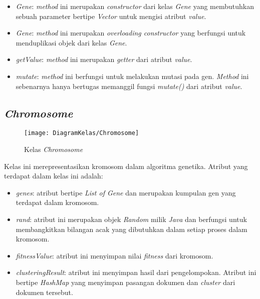 \begin{itemize}
	\item \textit{Gene}: \textit{method} ini merupakan \textit{constructor} dari kelas \textit{Gene} yang membutuhkan sebuah parameter bertipe \textit{Vector} untuk mengisi atribut \textit{value}.
	\item \textit{Gene}: \textit{method} ini merupakan \textit{overloading constructor} yang berfungsi untuk menduplikasi objek dari kelas \textit{Gene}.
	\item \textit{getValue}: \textit{method} ini merupakan \textit{getter} dari atribut \textit{value}.
	\item \textit{mutate}: \textit{method} ini berfungsi untuk melakukan mutasi pada gen. \textit{Method} ini sebenarnya hanya bertugas memanggil fungsi \textit{mutate()} dari atribut \textit{value}.
\end{itemize}

\subsection{\textit{Chromosome}}

\begin{figure}[H]
	\begin{center}
		\texttt{[image: DiagramKelas/Chromosome]}
		\caption{Kelas \textit{Chromosome}}
		\label{fig:kelasChromosome}
	\end{center}
\end{figure}

Kelas ini merepresentasikan kromosom dalam algoritma genetika. Atribut yang terdapat dalam kelas ini adalah:

\begin{itemize}
	\item \textit{genes}: atribut bertipe \textit{List of Gene} dan merupakan kumpulan gen yang terdapat dalam kromosom.
	\item \textit{rand}: atribut ini merupakan objek \textit{Random} milik \textit{Java} dan berfungsi untuk membangkitkan bilangan acak yang dibutuhkan dalam setiap proses dalam kromosom.
	\item \textit{fitnessValue}: atribut ini menyimpan nilai \textit{fitness} dari kromosom.
	\item \textit{clusteringResult}: atribut ini menyimpan hasil dari pengelompokan. Atribut ini bertipe \textit{HashMap} yang menyimpan pasangan dokumen dan \textit{cluster} dari dokumen tersebut.
\end{itemize}

